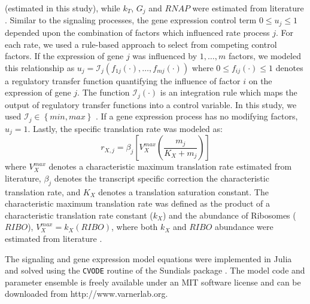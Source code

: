 \documentclass[12pt]{article}
\begin{document}
(estimated in this study), while $k_{T}$, $G_{j}$ and $RNAP$ were estimated from literature \citep{Milo:2010aa}.
Similar to the signaling processes, the gene expression control term $0\leq u_{j}\leq 1$ depended upon the combination of factors which influenced rate process $j$.
For each rate, we used a rule-based approach to select from competing control factors.
If the expression of gene $j$ was influenced by $1,\dots,m$ factors, we modeled this relationship as
$u_{j}=\mathcal{I}_{j}\left(f_{1j}\left(\cdot\right),\hdots,f_{mj}\left(\cdot\right)\right)$
where $0\leq f_{ij}\left(\cdot\right)\leq 1$ denotes a regulatory transfer function quantifying the influence of factor $i$ on the expression of gene $j$.
The function $\mathcal{I}_{j}\left(\cdot\right)$ is an integration rule which maps the output of regulatory transfer functions into a control
variable. In this study, we used $\mathcal{I}_{j}\in\left\{min,max\right\}$ \citep{pr3010178}.
If a gene expression process has no modifying factors, $u_{j}=1$.
Lastly, the specific translation rate was modeled as:
\begin{equation}
	r_{X,j} = \beta_{j}\left[V^{max}_{X}\left(\frac{m_{j}}{K_{X}+m_{j}}\right)\right]
\end{equation}where $V^{max}_{X}$ denotes a characteristic maximum translation rate estimated from literature, $\beta_{j}$ denotes the transcript specific correction the characteristic translation rate,
and $K_{X}$ denotes a translation saturation constant.
The characteristic maximum translation rate was defined as the product of a characteristic translation rate constant ($k_{X}$)
and the abundance of Ribosomes ($RIBO$), $V^{max}_{X} = k_{X}\left(RIBO\right)$, where both $k_{X}$ and $RIBO$ abundance were estimated from literature \citep{Milo:2010aa}.

The signaling and gene expression model equations were implemented in Julia and solved using the \texttt{CVODE} routine of the Sundials package \citep{Julia,Hindmarsh2005}.
The model code and parameter ensemble is freely available under an MIT software license and can be downloaded from http://www.varnerlab.org.
\end{document}

